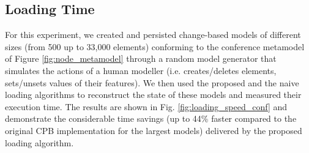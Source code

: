 \documentclass{llncs}
\begin{document}
\subsection{Loading Time}
\label{subsec:loading_time_test}

For this experiment, we created and persisted change-based models of different sizes (from 500 up to 33,000 elements) conforming to the conference metamodel of Figure \ref{fig:node_metamodel} through a random model generator that simulates the actions of a human modeller (i.e. creates/deletes elements, sets/unsets values of their features). We then used the proposed and the naive loading algorithms to reconstruct the state of these models and measured their execution time. The results are shown in Fig. \ref{fig:loading_speed_conf} and demonstrate the considerable time savings (up to 44\% faster compared to the original CPB implementation for the largest models) delivered by the proposed loading algorithm.
\end{document}
